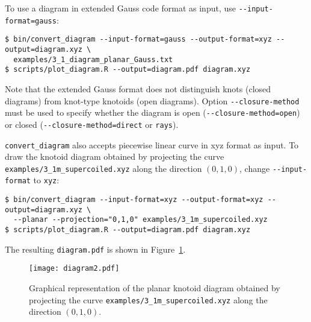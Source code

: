 To use a diagram in extended Gauss code format as input, use \lstinline{--input-format=gauss}:
\begin{lstlisting}
$ bin/convert_diagram --input-format=gauss --output-format=xyz --output=diagram.xyz \
  examples/3_1_diagram_planar_Gauss.txt
$ scripts/plot_diagram.R --output=diagram.pdf diagram.xyz
\end{lstlisting}
Note that the extended Gauss format does not distinguish knots (closed diagrams) from knot-type knotoids (open diagrams). Option \lstinline{--closure-method} must be used to specify whether the diagram is open (\lstinline{--closure-method=open}) or closed (\lstinline{--closure-method=direct} or \lstinline{rays}).


\lstinline{convert_diagram} also accepts piecewise linear curve in xyz format as input.  To draw the knotoid diagram obtained by projecting the curve \lstinline{examples/3_1m_supercoiled.xyz} along the direction $(0,1,0)$, change \lstinline{--input-format} to \lstinline{xyz}:
\begin{lstlisting}
$ bin/convert_diagram --input-format=xyz --output-format=xyz --output=diagram.xyz \
  --planar --projection="0,1,0" examples/3_1m_supercoiled.xyz
$ scripts/plot_diagram.R --output=diagram.pdf diagram.xyz
\end{lstlisting}
The resulting \lstinline{diagram.pdf} is shown in Figure~\ref{fig:diagram2}.
\begin{figure}[t]
\centering
\texttt{[image: diagram2.pdf]}
\caption{Graphical representation of the planar knotoid diagram obtained by projecting the curve \lstinline{examples/3_1m_supercoiled.xyz} along the direction $(0,1,0)$.}\label{fig:diagram2}
\end{figure}

